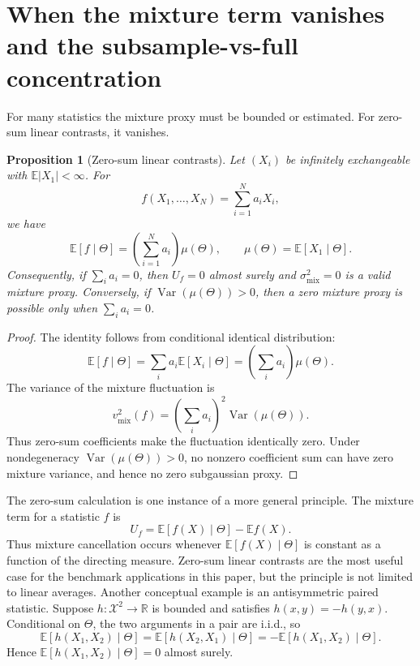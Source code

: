 \documentclass[11pt]{article}
\DeclareMathOperator{\Var}{Var}
\newcommand{\E}{\mathbb{E}}
\newtheorem{proposition}[theorem]{Proposition}
\theoremstyle{definition}
\theoremstyle{remark}
\begin{document}
\section{When the mixture term vanishes and the subsample-vs-full concentration}

For many statistics the mixture proxy must be bounded or estimated.  For zero-sum linear contrasts, it vanishes.

\begin{proposition}[Zero-sum linear contrasts]\label{prop:zero-sum}
Let $(X_i)$ be infinitely exchangeable with $\E|X_1|<\infty$.  For
\[
    f(X_1,\ldots,X_N)=\sum_{i=1}^N a_iX_i,
\]
we have
\[
    \E[f\mid\Theta]
    =
    \left(\sum_{i=1}^N a_i\right)\mu(\Theta),
    \qquad
    \mu(\Theta)=\E[X_1\mid\Theta].
\]
Consequently, if $\sum_i a_i=0$, then $U_f=0$ almost surely and $\sigma_{\mathrm{mix}}^2=0$ is a valid mixture proxy.  Conversely, if $\Var(\mu(\Theta))>0$, then a zero mixture proxy is possible only when $\sum_i a_i=0$.
\end{proposition}

\begin{proof}
The identity follows from conditional identical distribution:
\[
    \E[f\mid\Theta]=\sum_i a_i\E[X_i\mid\Theta]=\left(\sum_i a_i\right)\mu(\Theta).
\]
The variance of the mixture fluctuation is
\[
    v_{\mathrm{mix}}^2(f)
    =
    \left(\sum_i a_i\right)^2\Var(\mu(\Theta)).
\]
Thus zero-sum coefficients make the fluctuation identically zero.  Under nondegeneracy $\Var(\mu(\Theta))>0$, no nonzero coefficient sum can have zero mixture variance, and hence no zero subgaussian proxy.

\end{proof}



The zero-sum calculation is one instance of a more general principle.  The mixture term for a statistic \(f\) is
\[
    U_f=\E[f(X)\mid\Theta]-\E f(X).
\]
Thus mixture cancellation occurs whenever \(\E[f(X)\mid\Theta]\) is constant as a function of the directing measure.  Zero-sum linear contrasts are the most useful case for the benchmark applications in this paper, but the principle is not limited to linear averages. Another conceptual example is an antisymmetric paired statistic. Suppose \(h:\mathcal X^2\to\mathbb R\) is bounded and satisfies \(h(x,y)=-h(y,x)\). Conditional on \(\Theta\), the two arguments in a pair are i.i.d., so
\[
    \E[h(X_1,X_2)\mid\Theta]
    =
    \E[h(X_2,X_1)\mid\Theta]
    =
    -\E[h(X_1,X_2)\mid\Theta].
\]
Hence \(\E[h(X_1,X_2)\mid\Theta]=0\) almost surely.
\end{document}
